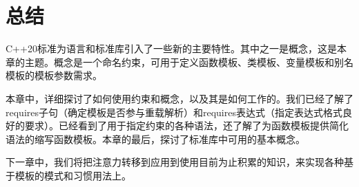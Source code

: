 \section{总结}
C++20标准为语言和标准库引入了一些新的主要特性。其中之一是概念，这是本章的主题。概念是一个命名约束，可用于定义函数模板、类模板、变量模板和别名模板的模板参数需求。

本章中，详细探讨了如何使用约束和概念，以及其是如何工作的。我们已经了解了requires子句（确定模板是否参与重载解析）和requires表达式（指定表达式格式良好的要求）。已经看到了用于指定约束的各种语法，还了解了为函数模板提供简化语法的缩写函数模板。本章的最后，探讨了标准库中可用的基本概念。

下一章中，我们将把注意力转移到应用到使用目前为止积累的知识，来实现各种基于模板的模式和习惯用法上。